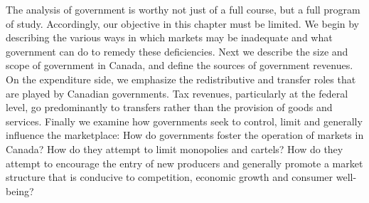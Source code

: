 The analysis of government is worthy not just of a full course, but a full
program of study. Accordingly, our objective in this chapter must be
limited. We begin by describing the various ways in which markets may be
inadequate and what government can do to remedy these deficiencies. Next we
describe the size and scope of government in Canada, and define the sources
of government revenues. On the expenditure side, we emphasize the
redistributive and transfer roles that are played by Canadian governments.
Tax revenues, particularly at the federal level, go predominantly to
transfers rather than the provision of goods and services. Finally we
examine how governments seek to control, limit and generally influence the
marketplace: How do governments foster the operation of markets in Canada?
How do they attempt to limit monopolies and cartels? How do they attempt to
encourage the entry of new producers and generally promote a market
structure that is conducive to competition, economic growth and consumer
well-being?